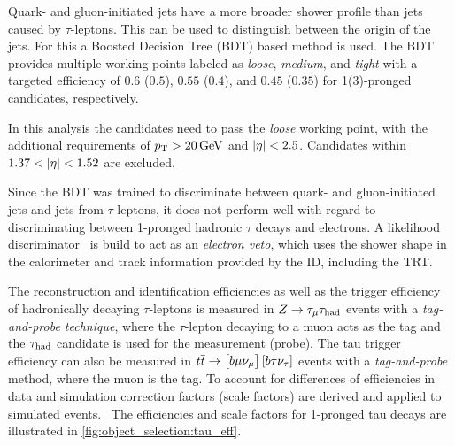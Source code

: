 Quark- and gluon-initiated jets have a more broader shower profile than jets caused by $\tau$-leptons.
This can be used to distinguish between the origin of the jets.
For this a Boosted Decision Tree (BDT) based method is used.
The BDT provides multiple working points labeled as \emph{loose}, \emph{medium}, and \emph{tight}
with a targeted efficiency of $0.6$ ($0.5$), $0.55$ ($0.4$), and $0.45$ ($0.35$) for 1(3)-pronged \tauhadvis{} candidates, respectively.

In this analysis the \tauhadvis{} candidates need to pass the \emph{loose} working point, with the additional requirements
of $\pt > \unit[20]{GeV}$ and $\left|\eta\right| < 2.5$.
Candidates within $1.37 < \left|\eta\right| < 1.52$ are excluded.

Since the BDT was trained to discriminate between quark- and gluon-initiated jets and jets from $\tau$-leptons, it
does not perform well with regard to discriminating between 1-pronged hadronic $\tau$ decays and electrons.
A likelihood discriminator~\cite{Run1TauPaper} is build to act as an \emph{electron veto}, which uses the shower shape in the calorimeter
and track information provided by the ID, including the TRT\@.

The reconstruction and identification efficiencies as well as the trigger efficiency of hadronically decaying $\tau$-leptons is measured in
$Z \to \tau_\mu \tau_\text{had}$ events with a \emph{tag-and-probe technique}, where the $\tau$-lepton decaying to a muon
acts as the tag and the $\tau_\text{had}$ candidate is used for the measurement (probe).
The tau trigger efficiency can also be measured in $t\overline{t} \to \left[b\mu\nu_\mu\right]\left[b\tau\nu_\tau\right]$ events
with a \emph{tag-and-probe} method, where the muon is the tag.
To account for differences of efficiencies in data and simulation correction factors (scale factors) are derived and applied to simulated
events.~\cite{ATL-PHYS-PUB-2015-045,ATLAS-CONF-2017-029}
The efficiencies and scale factors for 1-pronged tau decays are illustrated in \cref{fig:object_selection:tau_eff}.

